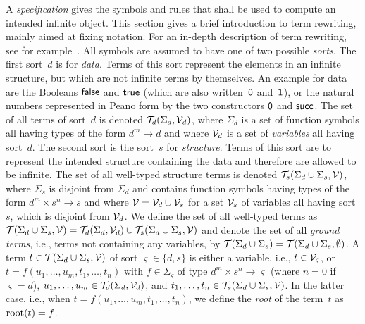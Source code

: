 \documentclass{eptcs}
\begin{document}
A \emph{specification} gives the symbols and rules that shall be used to
compute an intended infinite object. This section gives a brief introduction to
term rewriting, mainly aimed at fixing notation. For an in-depth description of
term rewriting, see for example~\cite{BN98, Terese03}.
All symbols are assumed to have one of two possible \emph{sorts}.
The first sort~$d$ is for \emph{data}. Terms of this sort represent the
elements in an infinite structure, but which are not infinite terms by
themselves. An example for data are the Booleans $\mathsf{false}$ and
$\mathsf{true}$ (which are also written~$\mathsf{0}$ and~$\mathsf{1}$),
or the natural numbers represented in Peano form by the two constructors $\mathsf{0}$
and $\mathsf{succ}$. The set of all terms of sort~$d$ is denoted
$\mathcal{T}_d(\Sigma_d, \mathcal{V}_d)$, where $\Sigma_d$ is a set of function symbols all having
types of the form $d^m \to d$ and where $\mathcal{V}_d$ is a set of \emph{variables}
all having sort~$d$.
The second sort is the sort~$s$ for \emph{structure}. Terms of this sort are to
represent the intended structure containing the data and therefore are allowed
to be infinite. The set of all well-typed structure terms is denoted
$\mathcal{T}_s(\Sigma_d \cup \Sigma_s, \mathcal{V})$, where
$\Sigma_s$ is disjoint from $\Sigma_d$ and contains function symbols having
types of the form $d^m \times s^n \to s$ and where
$\mathcal{V} = \mathcal{V}_d \cup \mathcal{V}_s$ for a set $\mathcal{V}_s$ of variables all having sort~$s$, which
is disjoint from $\mathcal{V}_d$.
We define the set of all well-typed terms as
$\mathcal{T}(\Sigma_d \cup \Sigma_s, \mathcal{V}) = \mathcal{T}_d(\Sigma_d, \mathcal{V}_d) \cup
\mathcal{T}_s(\Sigma_d \cup \Sigma_s, \mathcal{V})$ and denote
the set of all \emph{ground terms}, i.e., terms not containing any variables,
by $\mathcal{T}(\Sigma_d \cup \Sigma_s) =
\mathcal{T}(\Sigma_d \cup \Sigma_s, \emptyset)$.
A term $t \in \mathcal{T}(\Sigma_d \cup \Sigma_s, \mathcal{V})$ of sort $\varsigma \in \{ d, s \}$
is either a variable, i.e., $t \in \mathcal{V}_{\varsigma}$,
or $t = f(u_1, \dotsc, u_m, t_1, \dotsc, t_n)$
with $f \in \Sigma_{\varsigma}$ of type $d^m \times s^n \to \varsigma$
(where $n=0$ if $\varsigma=d$),
$u_1, \dotsc, u_m \in \mathcal{T}_d(\Sigma_d, \mathcal{V}_d)$,
and $t_1, \dotsc, t_n \in \mathcal{T}_s(\Sigma_d \cup \Sigma_s, \mathcal{V})$.
In the latter case, i.e., when $t = f(u_1, \dotsc, u_m, t_1, \dotsc, t_n)$, we
define the \emph{root} of the term~$t$ as $\mathrm{root}(t) = f$.
\end{document}

